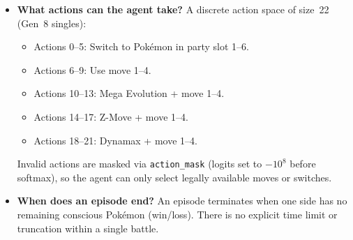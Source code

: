\documentclass[11pt, a4paper]{article}
\begin{document}
\begin{itemize}
        \textbf{Per-Pok\'{e}mon token} (164~dims): presence/active/fainted flags~(3) + HP~fraction~(1) + base~stats~(6) + types~(18) + status~(7) + volatile~effects~(9) + stat~boosts~(7) + item/ability~flags~(2) + weight~(1) + 4~moves $\times$~26~features~(104).

    \item \textbf{What actions can the agent take?}
        A discrete action space of size~22 (Gen~8 singles):
        \begin{itemize}
            \item Actions 0--5: Switch to Pok\'{e}mon in party slot 1--6.
            \item Actions 6--9: Use move 1--4.
            \item Actions 10--13: Mega Evolution + move 1--4.
            \item Actions 14--17: Z-Move + move 1--4.
            \item Actions 18--21: Dynamax + move 1--4.
        \end{itemize}
        Invalid actions are masked via \texttt{action\_mask} (logits set to $-10^8$ before softmax), so the agent can only select legally available moves or switches.

    \item \textbf{When does an episode end?}
        An episode terminates when one side has no remaining conscious Pok\'{e}mon (win/loss). There is no explicit time limit or truncation within a single battle.
\end{itemize}

\end{document}
